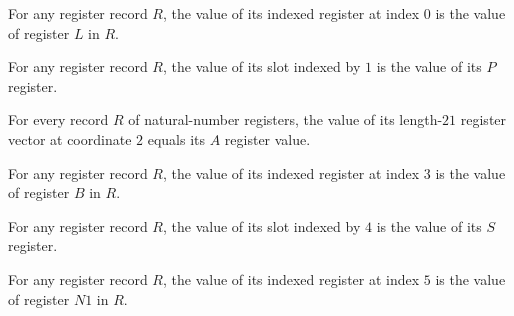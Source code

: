 \begin{lemma}
\label{Complexity.Codec.Regs.val_L}
\leanok
{}
For any register record $R$, the value of its indexed register at index $0$ is the value
of register $L$ in $R$.
\end{lemma}

\begin{lemma}
\label{Complexity.Codec.Regs.val_P}
\leanok
{}
For any register record $R$, the value of its slot indexed by $1$ is the value of its
$P$ register.
\end{lemma}

\begin{lemma}
\label{Complexity.Codec.Regs.val_A}
\leanok
{}
For every record $R$ of natural-number registers, the value of its length-$21$ register
vector at coordinate $2$ equals its $A$ register value.
\end{lemma}

\begin{lemma}
\label{Complexity.Codec.Regs.val_B}
\leanok
{}
For any register record $R$, the value of its indexed register at index $3$ is the value
of register $B$ in $R$.
\end{lemma}

\begin{lemma}
\label{Complexity.Codec.Regs.val_S}
\leanok
{}
For any register record $R$, the value of its slot indexed by $4$ is the value of its
$S$ register.
\end{lemma}

\begin{lemma}
\label{Complexity.Codec.Regs.val_N1}
\leanok
{}
For any register record $R$, the value of its indexed register at index $5$ is the value
of register $N1$ in $R$.
\end{lemma}

